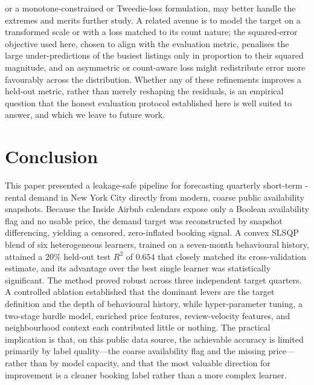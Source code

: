 \documentclass[review,12pt]{elsarticle}
\begin{document}
or a monotone-constrained or Tweedie-loss formulation, may better handle the
extremes and merits further study. A related avenue is to model the target on a
transformed scale or with a loss matched to its count nature; the squared-error
objective used here, chosen to align with the evaluation metric, penalises the large
under-predictions of the busiest listings only in proportion to their squared
magnitude, and an asymmetric or count-aware loss might redistribute error more
favourably across the distribution. Whether any of these refinements improves a
held-out metric, rather than merely reshaping the residuals, is an empirical
question that the honest evaluation protocol established here is well suited to
answer, and which we leave to future work.

\section{Conclusion}
\label{sec:concl}
This paper presented a leakage-safe pipeline for forecasting quarterly short-term
-rental demand in New York City directly from modern, coarse public availability
snapshots. Because the Inside Airbnb calendars expose only a Boolean availability
flag and no usable price, the demand target was reconstructed by snapshot
differencing, yielding a censored, zero-inflated booking signal. A convex SLSQP
blend of six heterogeneous learners, trained on a seven-month behavioural history,
attained a $20\%$ held-out test $R^2$ of $0.654$ that closely matched its
cross-validation estimate, and its advantage over the best single learner was
statistically significant. The method proved robust across three independent
target quarters. A controlled ablation established that the dominant levers are the
target definition and the depth of behavioural history, while hyper-parameter
tuning, a two-stage hurdle model, enriched price features, review-velocity
features, and neighbourhood context each contributed little or nothing. The
practical implication is that, on this public data source, the achievable accuracy
is limited primarily by label quality---the coarse availability flag and the
missing price---rather than by model capacity, and that the most valuable direction
for improvement is a cleaner booking label rather than a more complex learner.
\end{document}

